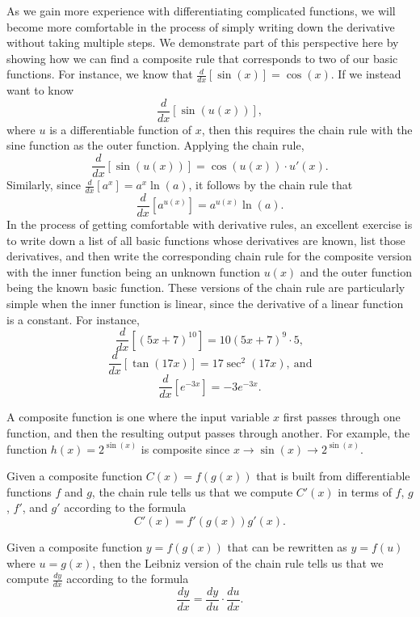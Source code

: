 As we gain more experience with differentiating complicated functions, we will become more comfortable in the process of simply writing down the derivative without taking multiple steps.  We demonstrate part of this perspective here by showing how we can find a composite rule that corresponds to two of our basic functions.  For instance, we know that $\frac{d}{dx}[\sin(x)] = \cos(x)$.  If we instead want to know
$$\frac{d}{dx}[\sin(u(x))],$$
where $u$ is a differentiable function of $x$, then this requires the chain rule with the sine function as the outer function.  Applying the chain rule,
$$\frac{d}{dx}[\sin(u(x))] = \cos(u(x)) \cdot u'(x).$$
Similarly, since $\frac{d}{dx}[a^x] = a^x \ln(a)$, it follows by the chain rule that 
$$\frac{d}{dx}[a^{u(x)}] = a^{u(x)} \ln(a).$$
In the process of getting comfortable with derivative rules, an excellent exercise is to write down a list of all basic functions whose derivatives are known, list those derivatives, and then write the corresponding chain rule for the composite version with the inner function being an unknown function $u(x)$ and the outer function being the known basic function.  These versions of the chain rule are particularly simple when the inner function is linear, since the derivative of a linear function is a constant.  For instance,
$$\frac{d}{dx} \left[ (5x+7)^{10} \right] = 10(5x+7)^9 \cdot 5,$$
$$\frac{d}{dx} \left[ \tan(17x) \right] = 17\sec^2(17x), \ \mbox{and}$$
$$\frac{d}{dx} \left[ e^{-3x} \right] = -3e^{-3x}.$$

\begin{summary}
\item A composite function is one where the input variable $x$ first passes through one function, and then the resulting output passes through another.  For example, the function $h(x) = 2^{\sin(x)}$ is composite since $x \longrightarrow \sin(x) \longrightarrow 2^{\sin(x)}.$

\item Given a composite function $C(x) = f(g(x))$ that is built from differentiable functions $f$ and $g$, the chain rule tells us that we compute $C'(x)$ in terms of $f$, $g$, $f'$, and $g'$ according to the formula
$$C'(x) = f'(g(x)) g'(x).$$  

\item Given a composite function $y= f(g(x))$ that can be rewritten as $y = f(u)$ where $u = g(x)$, then the Leibniz version of the chain rule tells us that we compute $\frac{dy}{dx}$ according to the formula
$$\frac{dy}{dx} = \frac{dy}{du} \cdot \frac{du}{dx}.$$  
\end{summary}

\clearpage

 

\cleardoublepage
